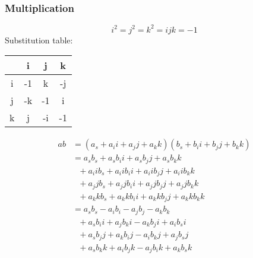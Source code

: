 \documentclass{article}
\begin{document}
\subsubsection{Multiplication}
$$ i^2 = j^2 = k^2 = ijk = -1 $$
Substitution table:
\begin{tabular}{ |c|c|c|c| }
    \hline
      & i  & j  & k \\
    \hline
    i & -1 & k  & -j \\
    \hline
    j & -k & -1 & i \\
    \hline
    k & j  & -i & -1 \\
    \hline
\end{tabular}
\begin{equation}
\begin{split}
ab & = (a_{s} + a_{i}i + a_{j}j + a_{k}k)(b_{s} + b_{i}i + b_{j}j + b_{k}k) \\
    & = a_{s}b_{s} + a_{s}b_{i}i + a_{s}b_{j}j + a_{s}b_{k}k \\
    & \ \ \ + a_{i}ib_{s} + a_{i}ib_{i}i + a_{i}ib_{j}j + a_{i}ib_{k}k \\
    & \ \ \ + a_{j}jb_{s} + a_{j}jb_{i}i + a_{j}jb_{j}j + a_{j}jb_{k}k \\
    & \ \ \ + a_{k}kb_{s} + a_{k}kb_{i}i + a_{k}kb_{j}j + a_{k}kb_{k}k \\
    & = a_{s}b_{s} - a_{i}b_{i} - a_{j}b_{j} - a_{k}b_{k} \\
    & \ \ \ + a_{s}b_{i}i + a_{j}b_{k}i - a_{k}b_{j}i + a_{i}b_{s}i \\
    & \ \ \ + a_{s}b_{j}j + a_{k}b_{i}j - a_{i}b_{k}j + a_{j}b_{s}j \\
    & \ \ \ + a_{s}b_{k}k + a_{i}b_{j}k - a_{j}b_{i}k + a_{k}b_{s}k
\end{split}
\end{equation}
\end{document}
